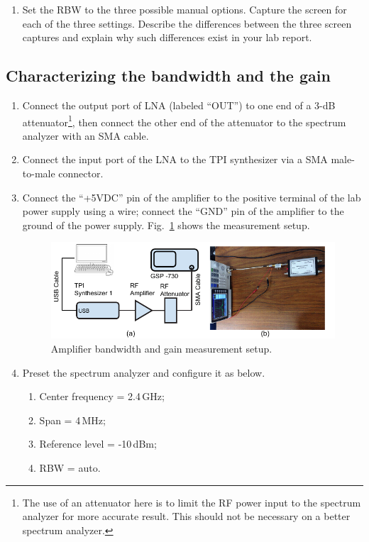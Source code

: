 \documentclass[letterpaper, 11pt]{article}
\begin{document}
\begin{enumerate}
\begin{enumerate}
			\item Set the RBW to the three possible manual options. Capture the screen for each of the three settings. Describe the differences between the three screen captures and explain why such differences exist in your lab report.
			
		\end{enumerate}
\end{enumerate}


\subsection{Characterizing the bandwidth and the gain}
\label{sec:bw-gain}

\begin{enumerate}
	\item Connect the output port of LNA (labeled ``OUT'') to one end of a 3-dB attenuator\footnote{The use of an attenuator here is to limit the RF power input to the spectrum analyzer for more accurate result. This should not be necessary on a better spectrum analyzer.}, then connect the other end of the attenuator to the spectrum analyzer with an SMA cable. 
	
	\item Connect the input port of the LNA to the TPI synthesizer via a SMA male-to-male connector.
	
	\item Connect the ``+5VDC'' pin of the amplifier to the positive terminal of the lab power supply using a wire; connect the ``GND'' pin of the amplifier to the ground of the power supply. Fig.~\ref{fig:setup-bw-gain} shows the measurement setup. 
	
		\begin{figure}[h]
			\centering
			\includegraphics[width=5in]{setup-bw-gain}
			\caption{Amplifier bandwidth and gain measurement setup.}
			\label{fig:setup-bw-gain}
		\end{figure}	
	
	\item Preset the spectrum analyzer and configure it as below.
		\begin{enumerate}
			\item Center frequency = 2.4\,GHz; 
			\item Span = 4\,MHz;
			\item Reference level = -10\,dBm;
			\item RBW = auto.
		\end{enumerate}
	

\end{enumerate}
\end{document}
